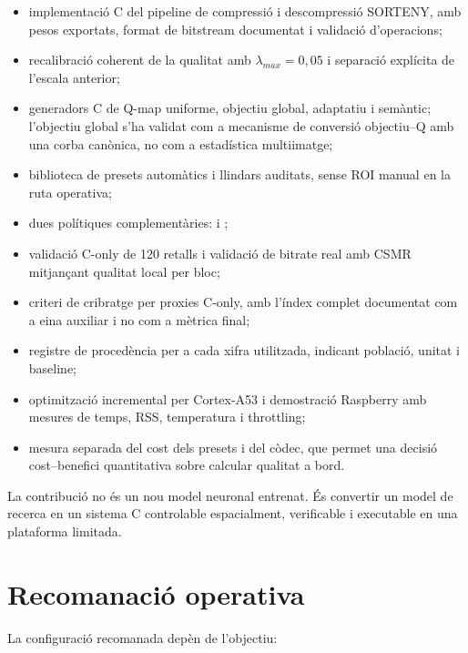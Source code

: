 \begin{itemize}[leftmargin=*]
  \item implementació C del pipeline de compressió i descompressió SORTENY,
  amb pesos exportats, format de bitstream documentat i validació d'operacions;
  \item recalibració coherent de la qualitat amb $\lambda_{max}=0,05$ i
  separació explícita de l'escala anterior;
  \item generadors C de Q-map uniforme, objectiu global, adaptatiu i semàntic;
  l'objectiu global s'ha validat com a mecanisme de conversió objectiu--Q amb
  una corba canònica, no com a estadística multiimatge;
  \item biblioteca de presets automàtics i llindars auditats, sense ROI
  manual en la ruta operativa;
  \item dues polítiques complementàries:  i
  ;
  \item validació C-only de 120 retalls i validació de bitrate real amb CSMR
  mitjançant qualitat local per bloc;
  \item criteri de cribratge per proxies C-only, amb l'índex complet documentat
  com a eina auxiliar i no com a mètrica final;
  \item registre de procedència per a cada xifra utilitzada, indicant població,
  unitat i baseline;
  \item optimització incremental per Cortex-A53 i demostració Raspberry amb
  mesures de temps, RSS, temperatura i throttling;
  \item mesura separada del cost dels presets i del còdec, que permet una
  decisió cost--benefici quantitativa sobre calcular qualitat a bord.
\end{itemize}

La contribució no és un nou model neuronal entrenat. És convertir un model de
recerca en un sistema C controlable espacialment, verificable i executable en
una plataforma limitada.

\section{Recomanació operativa}\label{sec:operational_recommendation}

La configuració recomanada depèn de l'objectiu:

